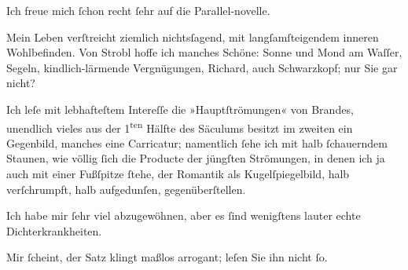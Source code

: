 \pstart
           {\pb}Ich freue mich{ }ſchon recht{ }ſehr
               auf die Parallel-novelle.\pend
           
\pstart
           Mein Leben verſtreicht ziemlich nichtsſagend, mit \introOben{}langſam\introOben{}{ }ſteigendem inneren Wohlbefinden. Von Strobl hoffe ich manches Schöne: Sonne und Mond am
               Waſſer, Segeln, kindlich-lärmende Vergnügungen, Richard, auch Schwarzkopf; nur Sie
               gar nicht?\pend
           
\pstart
           Ich leſe mit lebhafteſtem Intereſſe die »Hauptſtrömungen« von Brandes,
               unendlich vieles aus der 1\textsuperscript{ten} Hälfte des Säculums besitzt
               im zweiten ein Gegenbild, manches eine Carricatur; namentlich{ }ſehe ich mit halb{ }ſchauerndem Staunen, {\pb}wie völlig{ }ſich die \introOben{}Producte der\introOben{} jüngſten Strömungen, in denen ich ja
               auch mit einer Fußſpitze{ }ſtehe, der Romantik als Kugelſpiegelbild, halb verſchrumpft,
               halb aufgedunſen, gegenüberſtellen.\pend
           
\pstart
           Ich habe mir{ }ſehr viel abzugewöhnen, aber es{ }ſind wenigſtens lauter echte
               Dichterkrankheiten.\pend
           
\pstart
           Mir{ }ſcheint, der Satz klingt maßlos arrogant; leſen Sie ihn nicht{ }ſo.\pend
           
